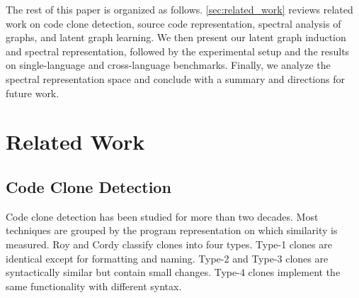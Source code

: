 \documentclass[final,5p,times,twocolumn]{elsarticle}
\theoremstyle{plain}
\begin{document}
The rest of this paper is organized as follows. \autoref{sec:related_work} reviews related work on code clone
detection, source code representation, spectral analysis of graphs, {and latent graph learning}. We then present our
latent graph induction and spectral representation, followed by the experimental setup and the results on single-language and cross-language benchmarks. Finally, we analyze the spectral representation space and conclude with a summary and directions for future work.


\section{Related Work}
\label{sec:related_work}


\subsection{Code Clone Detection}
\label{subsec:ccd}

Code clone detection has been studied for more than two decades. Most
techniques are grouped by the program representation on which similarity
is measured. Roy and Cordy \cite{roy2007survey} classify clones into four
types. Type-1 clones are identical except for formatting and naming.
Type-2 and Type-3 clones are syntactically similar but contain small
changes. Type-4 clones implement the same functionality with different
syntax.
\end{document}
